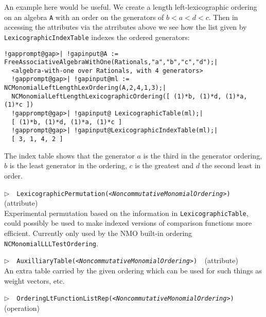 \documentclass[a4paper,11pt]{report}
\begin{document}
{{{ An example here would be useful. We create a length left-lexicographic
ordering on an algebra \texttt{A} with an order on the generators of $b < a < d < c$. Then in accessing the attributes via the atrributes above we see how the
list given by \texttt{LexicographicIndexTable} indexes the ordered generators: 
\begin{Verbatim}[commandchars=!@|,fontsize=\small,frame=single,label=Example]
  !gapprompt@gap>| !gapinput@A := FreeAssociativeAlgebraWithOne(Rationals,"a","b","c","d");|
  <algebra-with-one over Rationals, with 4 generators>
  !gapprompt@gap>| !gapinput@ml := NCMonomialLeftLengthLexOrdering(A,2,4,1,3);|
  NCMonomialLeftLengthLexicographicOrdering([ (1)*b, (1)*d, (1)*a, (1)*c ])
  !gapprompt@gap>| !gapinput@ LexicographicTable(ml);|
  [ (1)*b, (1)*d, (1)*a, (1)*c ]
  !gapprompt@gap>| !gapinput@LexicographicIndexTable(ml);|
  [ 3, 1, 4, 2 ]
\end{Verbatim}
 The index table shows that the generator $a$ is the third in the generator ordering, $b$ is the least generator in the ordering, $c$ is the greatest and $d$ the second least in order. 

 \noindent\textcolor{FuncColor}{$\triangleright$\ \ \texttt{LexicographicPermutation({\mdseries\slshape {\textless}NoncommutativeMonomialOrdering{\textgreater}})
\label{LexicographicPermutation}
}\hfill{\scriptsize (attribute)}}\\


 Experimental permutation based on the information in \texttt{LexicographicTable}, could possibly be used to make indexed versions of comparison functions more
efficient. Currently only used by the \textsf{NMO} built-in ordering \texttt{NCMonomialLLLTestOrdering}. 

 \noindent\textcolor{FuncColor}{$\triangleright$\ \ \texttt{AuxilliaryTable({\mdseries\slshape {\textless}NoncommutativeMonomialOrdering{\textgreater}})
\label{AuxilliaryTable}
}\hfill{\scriptsize (attribute)}}\\


 An extra table carried by the given ordering which can be used for such things
as weight vectors, etc. 

 \noindent\textcolor{FuncColor}{$\triangleright$\ \ \texttt{OrderingLtFunctionListRep({\mdseries\slshape {\textless}NoncommutativeMonomialOrdering{\textgreater}})
\label{OrderingLtFunctionListRep}
}\hfill{\scriptsize (operation)}}\\


}}}
\end{document}
